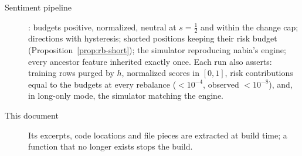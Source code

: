 \begin{description}
  \item[Sentiment pipeline] : budgets positive, normalized, neutral at
        $s=\tfrac12$ and within the change cap; directions with hysteresis; shorted positions keeping their risk
        budget (Proposition~\ref{prop:rb-short}); the simulator reproducing nabia's engine; every ancestor feature
        inherited exactly once. Each run also asserts: training rows purged by $h$, normalized scores in $[0,1]$,
        risk contributions equal to the budgets at every rebalance ($<10^{-4}$, observed $<10^{-8}$), and, in
        long-only mode, the simulator matching the engine.
  \item[This document] Its excerpts, code locations and file pieces are extracted at build time; a function that no
        longer exists stops the build.
\end{description}

